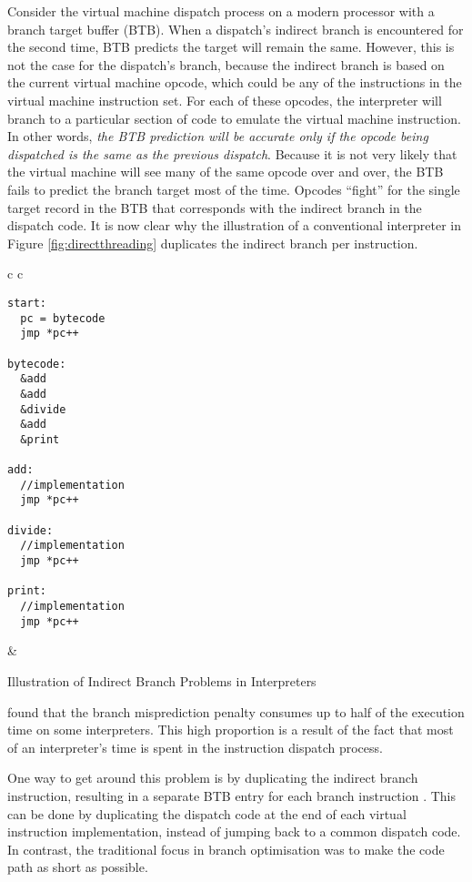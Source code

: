 		Consider the virtual machine dispatch process on a modern processor with a branch target buffer (BTB). When a dispatch's indirect branch is encountered for the second time, BTB predicts the target will remain the same. However, this is not the case for the dispatch's branch, because the indirect branch is based on the current virtual machine opcode, which could be any of the instructions in the virtual machine instruction set. For each of these opcodes, the interpreter will branch to a particular section of code to emulate the virtual machine instruction. In other words, \emph{the BTB prediction will be accurate only if the opcode being dispatched is the same as the previous dispatch}. Because it is not very likely that the virtual machine will see many of the same opcode over and over, the BTB fails to predict the branch target most of the time. Opcodes ``fight'' for the single target record in the BTB that corresponds with the indirect branch in the dispatch code. It is now clear why the illustration of a conventional interpreter in Figure \ref{fig:directthreading} duplicates the indirect branch per instruction.
		
		\begin{myfigure}
			\begin{tabular}{c c}
				{
				\begin{lstlisting}
start:
  pc = bytecode
  jmp *pc++

bytecode:
  &add
  &add
  &divide
  &add
  &print

add:
  //implementation
  jmp *pc++

divide:
  //implementation
  jmp *pc++

print:
  //implementation
  jmp *pc++
				\end{lstlisting}
			} & 
			{
			}
			\end{tabular}
			\caption{Illustration of Indirect Branch Problems in Interpreters}
			\label{fig:interpreterbtb}
		\end{myfigure}
		
		\cite{structureinterpreters} found that the branch misprediction penalty consumes up to half of the execution time on some interpreters. This high proportion is a result of the fact that most of an interpreter's time is spent in the instruction dispatch process.
		
		One way to get around this problem is by duplicating the indirect branch instruction, resulting in a separate BTB entry for each branch instruction \citep{fastjava}. This can be done by duplicating the dispatch code at the end of each virtual instruction implementation, instead of jumping back to a common dispatch code. In contrast, the traditional focus in branch optimisation was to make the code path as short as possible.
		
